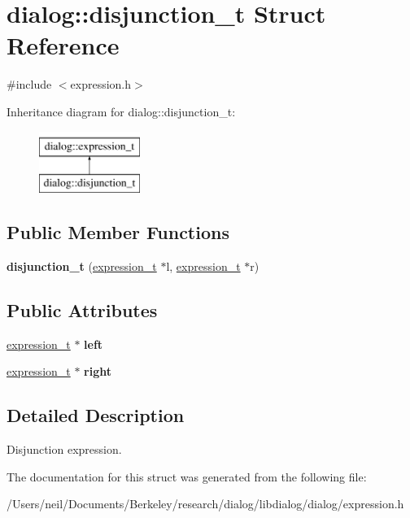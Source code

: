 \hypertarget{structdialog_1_1disjunction__t}{}\section{dialog\+:\+:disjunction\+\_\+t Struct Reference}
\label{structdialog_1_1disjunction__t}


{\ttfamily \#include $<$expression.\+h$>$}

Inheritance diagram for dialog\+:\+:disjunction\+\_\+t\+:\begin{figure}[H]
\begin{center}
\leavevmode
\includegraphics[height=2.000000cm]{structdialog_1_1disjunction__t}
\end{center}
\end{figure}
\subsection*{Public Member Functions}
\begin{DoxyCompactItemize}
\item 
\mbox{\label{structdialog_1_1disjunction__t_aec8aa792702fd0da7d18cd473dc10ab7}} 
{\bfseries disjunction\+\_\+t} (\hyperlink{structdialog_1_1expression__t}{expression\+\_\+t} $\ast$l, \hyperlink{structdialog_1_1expression__t}{expression\+\_\+t} $\ast$r)
\end{DoxyCompactItemize}
\subsection*{Public Attributes}
\begin{DoxyCompactItemize}
\item 
\mbox{\label{structdialog_1_1disjunction__t_af604bfee648d8c1914368fc18167c708}} 
\hyperlink{structdialog_1_1expression__t}{expression\+\_\+t} $\ast$ {\bfseries left}
\item 
\mbox{\label{structdialog_1_1disjunction__t_aa8f1bb1031ae3934b37237ff5f50eae6}} 
\hyperlink{structdialog_1_1expression__t}{expression\+\_\+t} $\ast$ {\bfseries right}
\end{DoxyCompactItemize}


\subsection{Detailed Description}
Disjunction expression. 

The documentation for this struct was generated from the following file\+:\begin{DoxyCompactItemize}
\item 
/\+Users/neil/\+Documents/\+Berkeley/research/dialog/libdialog/dialog/expression.\+h\end{DoxyCompactItemize}
